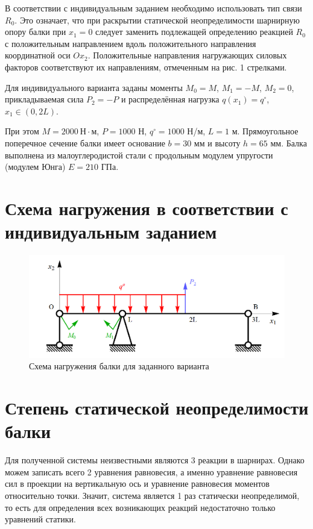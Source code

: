 \documentclass[12pt, a4paper]{article}
\begin{document}
В соответствии с индивидуальным заданием необходимо использовать тип связи $R_0$. Это означает, что при раскрытии статической неопределимости шарнирную опору балки при $x_1 = 0$ следует заменить подлежащей определению реакцией $R_0$ с положительным направлением вдоль положительного направления координатной оси $Ox_2$. Положительные направления нагружающих силовых факторов соответствуют их направлениям, отмеченным на рис. 1 стрелками. 

Для индивидуального варианта заданы моменты $M_0 = M$, $M_1 = -M$, $M_2 = 0$, прикладываемая сила $P_2 = -P$ и распределённая нагрузка $q(x_1) = q^{\circ}$, $x_1 \in (0, 2L)$. 

При этом $M = 2000 \ \text{Н} \! \cdot \! \text{м}$, $P = 1000$ Н, $q^{\circ} = 1000$ Н/м, $L = 1$ м. Прямоугольное поперечное сечение балки имеет основание $b = 30$ мм и высоту $h = 65$ мм. Балка выполнена из малоуглеродистой стали с продольным модулем упругости (модулем Юнга) $E = 210$ ГПа.

\newpage

\section{Схема нагружения в соответствии с индивидуальным заданием}

\vspace{-1em}

\begin{figure}[!h]
	\centering
	\includegraphics[width=0.75\linewidth]{plot-2}
	\caption{Схема нагружения балки для заданного варианта}
\end{figure}

\section{Степень статической неопределимости балки}

Для полученной системы неизвестными являются 3 реакции в шарнирах. Однако можем записать всего 2 уравнения равновесия, а именно уравнение равновесия сил в проекции на вертикальную ось и уравнение равновесия моментов относительно точки. Значит, система является 1 раз статически неопределимой, то есть для определения всех возникающих реакций недостаточно только уравнений статики.
\end{document}
